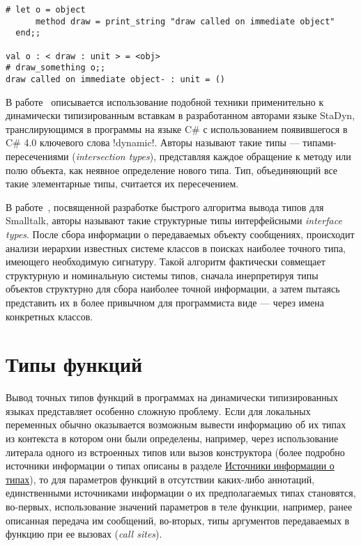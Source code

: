 \begin{lstlisting}
# let o = object
      method draw = print_string "draw called on immediate object"
  end;;

val o : < draw : unit > = <obj>
# draw_something o;;
draw called on immediate object- : unit = ()
\end{lstlisting}
\lstset{language=Python}

В работе~\cite{Ortin2011:union} описывается использование подобной техники
применительно к динамически типизированным вставкам в разработанном авторами
языке StaDyn, транслирующимся в программы на языке C\# с использованием
появившегося в C\# 4.0 ключевого слова !dynamic!.  Авторы называют такие
типы --- типами-пересечениями (\emph{intersection types}), представляя каждое
обращение к методу или полю объекта, как неявное определение нового типа. Тип,
объединяющий все такие элементарные типы, считается их пересечением.

В работе~\cite{Pluquet2009}, посвященной разработке быстрого алгоритма вывода
типов для Smalltalk, авторы называют такие структурные типы интерфейсными 
\emph{interface types}. После сбора информации о передаваемых объекту сообщениях,
происходит анализи иерархии известных системе классов в поисках наиболее
точного типа, имеющего необходимую сигнатуру. Такой алгоритм фактически
совмещает структурную и номинальную системы типов, сначала инерпретируя типы
объектов структурно для сбора наиболее точной информации, а затем пытаясь
представить их в более привычном для программиста виде --- через имена
конкретных классов.

\section{Типы функций}

Вывод точных типов функций в программах на динамически типизированных языках
представляет особенно сложную проблему. Если для локальных переменных обычно
оказывается возможным вывести информацию об их типах из контекста в котором они
были определены, например, через использование литерала одного из встроенных
типов или вызов конструктора (более подробно источники информации о типах
описаны в разделе \hyperref[sec:type-sources]{Источники информации о типах}), то
для параметров функций в отсутствии каких-либо аннотаций, единственными
источниками информации о их предполагаемых типах становятся, во-первых,
использование значений параметров в теле функции, например, ранее описанная
передача им сообщений, во-вторых, типы аргументов передаваемых в функцию при ее
вызовах (\emph{call sites}).

